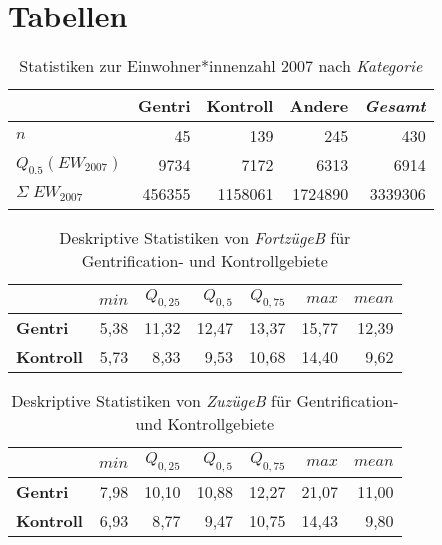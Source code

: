 \newpage
\section{Tabellen}

\begin{table}[H]
\centering
\begin{tabular}{@{}lrrrr@{}}
\toprule
                                       & \multicolumn{1}{r}{{\bf Gentri}} & \multicolumn{1}{r}{{\bf Kontroll}} & \multicolumn{1}{r}{{\bf Andere}} & \multicolumn{1}{r}{{\bf \textit{Gesamt}}} \\ \midrule
$n$                                    & 45                               & 139                                & 245                              & 430                                  \\
$Q_{0.5}(EW_{2007})$                   & 9734                             & 7172                               & 6313                             & 6914                                 \\
$\Sigma\;EW_{2007}$                    & 456355                           & 1158061                            & 1724890                          & 3339306                              \\ \bottomrule
\end{tabular}
\caption{Statistiken zur Einwohner*innenzahl 2007 nach \textit{Kategorie}}\label{tab:KategorieEW}
\end{table}            

\begin{table}[H]
\centering
\begin{tabular}{@{}lrrrrrr@{}}
\toprule
               & $min$ & $Q_{0,25}$ & $Q_{0,5}$ & $Q_{0,75}$ & $max$ & $mean$ \\ \midrule
{\bf Gentri}   & 5,38 & 11,32 & 12,47 & 13,37 & 15,77 & 12,39 \\
{\bf Kontroll} & 5,73 &  8,33 &  9,53 & 10,68 & 14,40 & 9,62 \\ \bottomrule
\end{tabular}
\caption{Deskriptive Statistiken von \textit{FortzügeB} für Gentrification- und Kontrollgebiete}
\label{tab:FortzuegeR}
\end{table}

\begin{table}[H]
\centering
\begin{tabular}{@{}lrrrrrr@{}}
\toprule
               & $min$ & $Q_{0,25}$ & $Q_{0,5}$ & $Q_{0,75}$ & $max$ & $mean$ \\ \midrule
{\bf Gentri}   & 7,98 & 10,10 & 10,88 & 12,27 & 21,07 & 11,00 \\
{\bf Kontroll} & 6,93 & 8,77 & 9,47 & 10,75 & 14,43 &  9,80  \\ \bottomrule
\end{tabular}
\caption{Deskriptive Statistiken von \textit{ZuzügeB} für Gentrification- und Kontrollgebiete}
\label{tab:ZuzuegeR}
\end{table}


